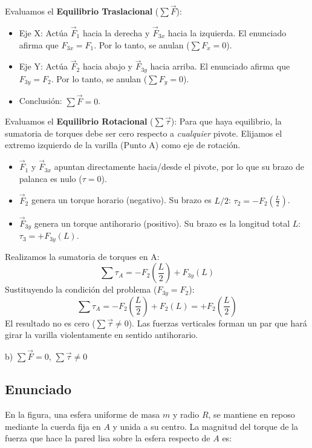\documentclass[12pt, a4paper]{article}
\begin{document}
Evaluamos el \textbf{Equilibrio Traslacional} ($\sum \vec{F}$):
\begin{itemize}
    \item Eje X: Actúa $\vec{F}_1$ hacia la derecha y $\vec{F}_{3x}$ hacia la izquierda. El enunciado afirma que $F_{3x} = F_1$. Por lo tanto, se anulan ($\sum F_x = 0$).
    \item Eje Y: Actúa $\vec{F}_2$ hacia abajo y $\vec{F}_{3y}$ hacia arriba. El enunciado afirma que $F_{3y} = F_2$. Por lo tanto, se anulan ($\sum F_y = 0$).
    \item Conclusión: $\sum \vec{F} = 0$.
\end{itemize}

Evaluamos el \textbf{Equilibrio Rotacional} ($\sum \vec{\tau}$):
Para que haya equilibrio, la sumatoria de torques debe ser cero respecto a \textit{cualquier} pivote. Elijamos el extremo izquierdo de la varilla (Punto A) como eje de rotación.
\begin{itemize}
    \item $\vec{F}_1$ y $\vec{F}_{3x}$ apuntan directamente hacia/desde el pivote, por lo que su brazo de palanca es nulo ($\tau = 0$).
    \item $\vec{F}_2$ genera un torque horario (negativo). Su brazo es $L/2$: $\tau_2 = -F_2 \left(\frac{L}{2}\right)$.
    \item $\vec{F}_{3y}$ genera un torque antihorario (positivo). Su brazo es la longitud total $L$: $\tau_3 = +F_{3y} (L)$.
\end{itemize}
Realizamos la sumatoria de torques en A:
$$ \sum \tau_A = -F_2 \left(\frac{L}{2}\right) + F_{3y} (L) $$
Sustituyendo la condición del problema ($F_{3y} = F_2$):
$$ \sum \tau_A = -F_2 \left(\frac{L}{2}\right) + F_2 (L) = +F_2 \left(\frac{L}{2}\right) $$
El resultado no es cero ($\sum \vec{\tau} \neq 0$). Las fuerzas verticales forman un par que hará girar la varilla violentamente en sentido antihorario.

\begin{tcolorbox}[colback=green!5!white, colframe=green!50!black, title=Respuesta Final]
\centering \Large b) $\sum \vec{F} = 0$, $\sum \vec{\tau} \neq 0$
\end{tcolorbox}

\newpage

\subsection*{Enunciado}
En la figura, una esfera uniforme de masa $m$ y radio $R$, se mantiene en reposo mediante la cuerda fija en $A$ y unida a su centro. La magnitud del torque de la fuerza que hace la pared lisa sobre la esfera respecto de $A$ es:
\end{document}
